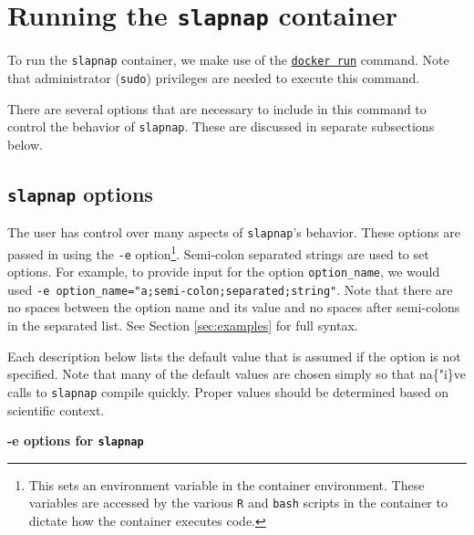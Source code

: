 \documentclass[]{article}
\begin{document}
\section{\texorpdfstring{Running the \texttt{slapnap}
container}{Running the slapnap container}}\label{sec:runningcontainer}

To run the \texttt{slapnap} container, we make use of the
\href{https://docs.docker.com/engine/reference/run/}{\texttt{docker\ run}}
command. Note that administrator (\texttt{sudo}) privileges are needed
to execute this command.

There are several options that are necessary to include in this command
to control the behavior of \texttt{slapnap}. These are discussed in
separate subsections below.

\subsection{\texorpdfstring{\texttt{slapnap}
options}{slapnap options}}\label{sec:opts}

The user has control over many aspects of \texttt{slapnap}'s behavior.
These options are passed in using the \texttt{-e} option\footnote{This
  sets an environment variable in the container environment. These
  variables are accessed by the various \texttt{R} and \texttt{bash}
  scripts in the container to dictate how the container executes code.}.
Semi-colon separated strings are used to set options. For example, to
provide input for the option \texttt{option\_name}, we would used
\texttt{-e\ option\_name="a;semi-colon;separated;string"}. Note that
there are no spaces between the option name and its value and no spaces
after semi-colons in the separated list. See Section \ref{sec:examples}
for full syntax.

Each description below lists the default value that is assumed if the
option is not specified. Note that many of the default values are chosen
simply so that na\{"i\}ve calls to \texttt{slapnap} compile quickly.
Proper values should be determined based on scientific context.

\textbf{-e options for \texttt{slapnap}}
\end{document}
